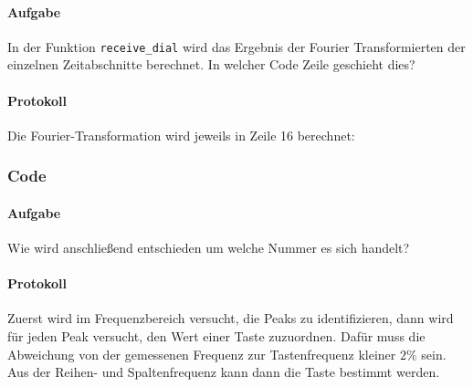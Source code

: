 \documentclass[10pt]{report}
\begin{document}
        \paragraph{Aufgabe}
        In der Funktion \texttt{receive\_dial} wird das Ergebnis der Fourier Transformierten der
        einzelnen Zeitabschnitte berechnet. In welcher Code Zeile geschieht dies?

        \paragraph{Protokoll}
        Die Fourier-Transformation wird jeweils in Zeile 16 berechnet:
        


        \subsubsection{Code}
        \paragraph{Aufgabe}
        Wie wird anschließend entschieden um welche Nummer es sich handelt?

        \paragraph{Protokoll}
        Zuerst wird im Frequenzbereich versucht, die Peaks zu identifizieren,
        dann wird für jeden Peak versucht, den Wert einer Taste
        zuzuordnen. Dafür muss die Abweichung von der gemessenen Frequenz zur
        \glqq{}Tastenfrequenz\grqq{} kleiner $2\%$ sein. Aus der Reihen- und
        Spaltenfrequenz kann dann die Taste bestimmt werden.
        
\end{document}
